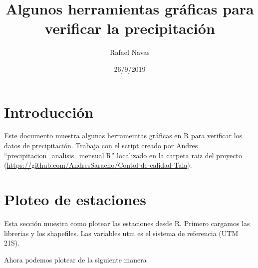 \documentclass[]{article}
\title{Algunos herramientas gráficas para verificar la precipitación}
\author{Rafael Navas}
\date{26/9/2019}
\newenvironment{Shaded}{\begin{snugshade}}{\end{snugshade}}
\newcommand{\DataTypeTok}[1]{\textcolor[rgb]{0.13,0.29,0.53}{#1}}
\newcommand{\DecValTok}[1]{\textcolor[rgb]{0.00,0.00,0.81}{#1}}
\newcommand{\KeywordTok}[1]{\textcolor[rgb]{0.13,0.29,0.53}{\textbf{#1}}}
\newcommand{\NormalTok}[1]{#1}
\newcommand{\OperatorTok}[1]{\textcolor[rgb]{0.81,0.36,0.00}{\textbf{#1}}}
\newcommand{\StringTok}[1]{\textcolor[rgb]{0.31,0.60,0.02}{#1}}
\begin{document}
\maketitle

\hypertarget{introduccion}{%
\section{Introducción}\label{introduccion}}

Este documento muestra algunas herrameintas gráficas en R para verificar
los datos de precipitación. Trabaja con el script creado por Andres
``precipitacion\_analisis\_mensual.R'' localizado en la carpeta raiz del
proyecto
(\url{https://github.com/AndresSaracho/Contol-de-calidad-Tala}).

\hypertarget{ploteo-de-estaciones}{%
\section{Ploteo de estaciones}\label{ploteo-de-estaciones}}

Esta sección muestra como plotear las estaciones desde R. Primero
cargamos las librerias y los shapefiles. Las variables utm es el sistema
de referencia (UTM 21S).

\begin{Shaded}
\end{Shaded}

Ahora podemos plotear de la siguiente manera
\end{document}
